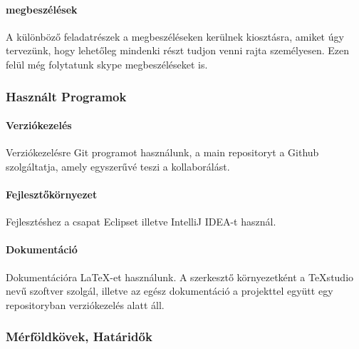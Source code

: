\paragraph{megbeszélések} A különböző feladatrészek a megbeszéléseken kerülnek kiosztásra, amiket úgy tervezünk, hogy lehetőleg mindenki részt tudjon venni rajta személyesen. Ezen felül még folytatunk skype megbeszéléseket is.

\subsubsection{Használt Programok}

\paragraph{Verziókezelés} Verziókezelésre Git programot használunk, a main repositoryt a Github szolgáltatja, amely egyszerűvé teszi a kollaborálást.

\paragraph{Fejlesztőkörnyezet} Fejlesztéshez a csapat Eclipset illetve IntelliJ IDEA-t használ.

\paragraph{Dokumentáció} Dokumentációra LaTeX-et használunk. A szerkesztő környezetként a TeXstudio nevű szoftver szolgál, illetve az egész dokumentáció a projekttel együtt egy repositoryban verziókezelés alatt áll.

\subsubsection{Mérföldkövek, Határidők}

